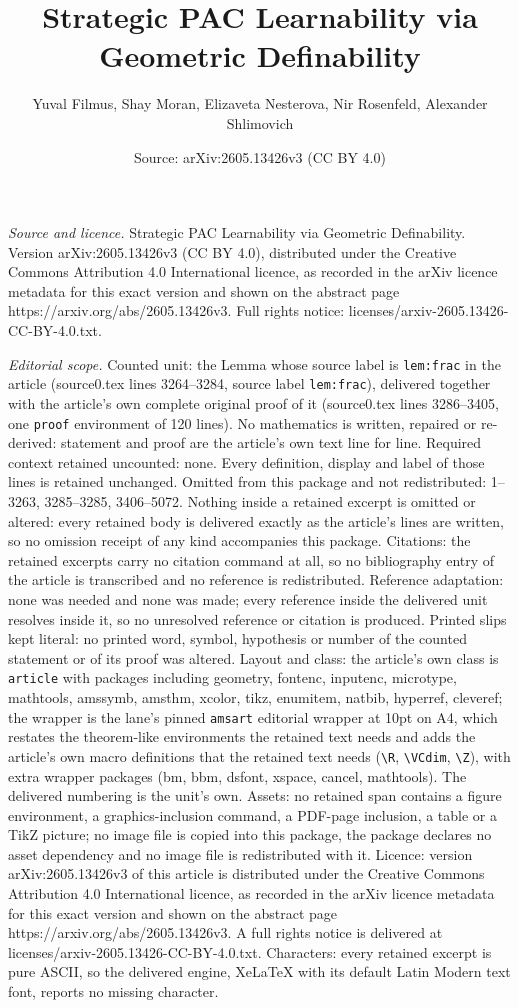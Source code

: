 \documentclass[10pt,a4paper]{amsart}
\title[Strategic PAC Learnability via Geometric Definability]{Strategic PAC Learnability via Geometric Definability}
\author{Yuval Filmus, Shay Moran, Elizaveta Nesterova, Nir Rosenfeld, Alexander Shlimovich}
\date{Source: arXiv:2605.13426v3 (CC BY 4.0)}
\begin{document}
\maketitle

\noindent\emph{Source and licence.} Strategic PAC Learnability via Geometric Definability. Version arXiv:2605.13426v3 (CC BY 4.0), distributed under the Creative Commons Attribution 4.0 International licence, as recorded in the arXiv licence metadata for this exact version and shown on the abstract page https://arxiv.org/abs/2605.13426v3. Full rights notice: licenses/arxiv-2605.13426-CC-BY-4.0.txt.\par\smallskip

\noindent\textit{Editorial scope.} Counted unit: the Lemma whose source label is \texttt{lem:frac} in the article (source0.tex lines 3264--3284, source label \texttt{lem:frac}), delivered together with the article's own complete original proof of it (source0.tex lines 3286--3405, one \texttt{proof} environment of 120 lines). No mathematics is written, repaired or re-derived: statement and proof are the article's own text line for line. Required context retained uncounted: none. Every definition, display and label of those lines is retained unchanged. Omitted from this package and not redistributed: 1--3263, 3285--3285, 3406--5072. Nothing inside a retained excerpt is omitted or altered: every retained body is delivered exactly as the article's lines are written, so no omission receipt of any kind accompanies this package. Citations: the retained excerpts carry no citation command at all, so no bibliography entry of the article is transcribed and no reference is redistributed. Reference adaptation: none was needed and none was made; every reference inside the delivered unit resolves inside it, so no unresolved reference or citation is produced. Printed slips kept literal: no printed word, symbol, hypothesis or number of the counted statement or of its proof was altered. Layout and class: the article's own class is \texttt{article} with packages including geometry, fontenc, inputenc, microtype, mathtools, amssymb, amsthm, xcolor, tikz, enumitem, natbib, hyperref, cleveref; the wrapper is the lane's pinned \texttt{amsart} editorial wrapper at 10pt on A4, which restates the theorem-like environments the retained text needs and adds the article's own macro definitions that the retained text needs (\texttt{\textbackslash R}, \texttt{\textbackslash VCdim}, \texttt{\textbackslash Z}), with extra wrapper packages (bm, bbm, dsfont, xspace, cancel, mathtools). The delivered numbering is the unit's own. Assets: no retained span contains a figure environment, a graphics-inclusion command, a PDF-page inclusion, a table or a TikZ picture; no image file is copied into this package, the package declares no asset dependency and no image file is redistributed with it. Licence: version arXiv:2605.13426v3 of this article is distributed under the Creative Commons Attribution 4.0 International licence, as recorded in the arXiv licence metadata for this exact version and shown on the abstract page https://arxiv.org/abs/2605.13426v3. A full rights notice is delivered at licenses/arxiv-2605.13426-CC-BY-4.0.txt. Characters: every retained excerpt is pure ASCII, so the delivered engine, XeLaTeX with its default Latin Modern text font, reports no missing character.
\end{document}
